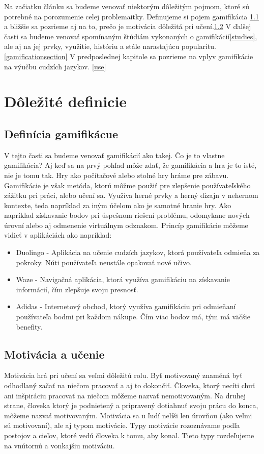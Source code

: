 \documentclass[10pt,oneside,slovak,a4paper]{article}
\begin{document}
Na začiatku článku sa budeme venovať niektorým dôležitým pojmom, ktoré sú potrebné na porozumenie celej problemaitky. Definujeme si pojem gamifikácia \ref{gamifikacia} a bližšie sa pozrieme aj na to, prečo je motivácia dôležitá pri učení.\ref{motivacia} V ďalšej časti sa budeme venovať spomínaným štúdiám vykonaných o gamifikácií\ref{studies}, ale aj na jej prvky, využitie, históriu a stále narastajúcu popularitu.\ref{gamificationsection} V predposlednej kapitole sa pozrieme na vplyv gamifikácie na výučbu cudzích jazykov. \ref{use}




\section{Dôležité definicie} \label{definicie}
\subsection{Definícia gamifikácue} \label{gamifikacia}
V tejto časti sa budeme venovať gamifikácií ako takej. Čo je to vlastne gamifikácia? Aj keď sa na prvý pohľad môže zdať, že gamifikácia a hra je to isté, nie je tomu tak. Hry ako počítačové alebo stolné hry hráme pre zábavu. Gamifikácie je však metóda, ktorú môžme použiť pre zlepšenie používateľského zážitku pri práci, alebo učení sa. Využíva herné prvky a herný dizajn v nehernom kontexte, teda napríklad za iným účelom ako je samotné hranie hry. Ako napríklad získavanie bodov pri úspešnom riešení problému, odomykane nových úrovní alebo aj odmenenie virtuálnym odznakom. Princíp gamifikácie môžeme vidieť v aplikáciách ako napríklad:

\begin{itemize}
    \item Duolingo - Aplikácia na učenie cudzích jazykov, ktorá používateľa odmieňa za pokroky. Núti používateľa neustále opakovať nové učivo.
    \item Waze - Navigačná aplikácia, ktorá využíva gamifikáciu na získavanie informácií, čím zlepšuje svoju presnosť.
    \item Adidas - Internetový obchod, ktorý využíva gamifikáciu pri odmieňaní používateľa bodmi pri každom nákupe. Čím viac bodov má, tým má väčšie benefity.
\end{itemize}



\subsection{Motivácia a učenie} \label{motivacia}
Motivácia hrá pri učení sa veľmi dôležitú rolu. Byť motivovaný znaméná byť odhodlaný začať na niečom pracovať a aj to dokončiť. Človeka, ktorý necíti chuť ani inšpiráciu pracovať na niečom môžeme nazvať nemotivovaným. Na druhej strane, človeka ktorý je podnietený a pripravený dotiahnuť svoju prácu do konca, môžeme nazvať motivovaným. Motivácia sa u ľudí nelíši len úrovňou (ako veľmi sú motivovaní), ale aj typom motivácie. Typy motivácie rozoznávame podľa postojov a cieľov, ktoré vedú človeka k tomu, aby konal. Tieto typy rozdeľujeme na vnútornú a vonkajšiu motiváciu. ~\cite{ryan2000intrinsic}
\end{document}
